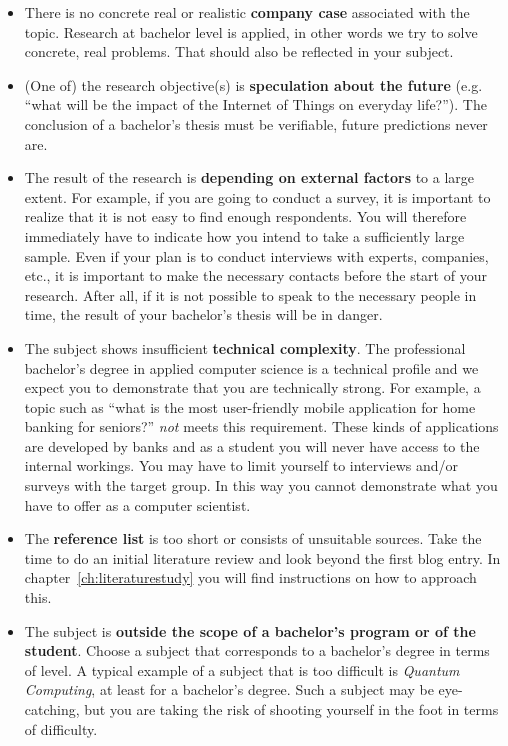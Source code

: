 \begin{itemize}
  \item There is no concrete real or realistic \textbf{company case} associated with the topic. Research at bachelor level is applied, in other words we try to solve concrete, real problems. That should also be reflected in your subject.
  \item (One of) the research objective(s) is \textbf{speculation about the future} (e.g.  ``what will be the impact of the Internet of Things on everyday life?''). The conclusion of a bachelor's thesis must be verifiable, future predictions never are.
  \item The result of the research is \textbf{depending on external factors} to a large extent. For example, if you are going to conduct a survey, it is important to realize that it is not easy to find enough respondents. You will therefore immediately have to indicate how you intend to take a sufficiently large sample. Even if your plan is to conduct interviews with experts, companies, etc., it is important to make the necessary contacts before the start of your research. After all, if it is not possible to speak to the necessary people in time, the result of your bachelor's thesis will be in danger.
  \item The subject shows insufficient \textbf{technical complexity}. The professional bachelor's degree in applied computer science is a technical profile and we expect you to demonstrate that you are technically strong. For example, a topic such as ``what is the most user-friendly mobile application for home banking for seniors?'' \textit{not} meets this requirement. These kinds of applications are developed by banks and as a student you will never have access to the internal workings. You may have to limit yourself to interviews and/or surveys with the target group. In this way you cannot demonstrate what you have to offer as a computer scientist.
  \item The \textbf{reference list} is too short or consists of unsuitable sources. Take the time to do an initial literature review and look beyond the first blog entry. In chapter~\ref{ch:literaturestudy} you will find instructions on how to approach this.
  \item The subject is \textbf{outside the scope of a bachelor's program or of the student}. Choose a subject that corresponds to a bachelor's degree in terms of level. A typical example of a subject that is too difficult is \textit{Quantum Computing}, at least for a bachelor's degree. Such a subject may be eye-catching, but you are taking the risk of shooting yourself in the foot in terms of difficulty.     
\end{itemize}

